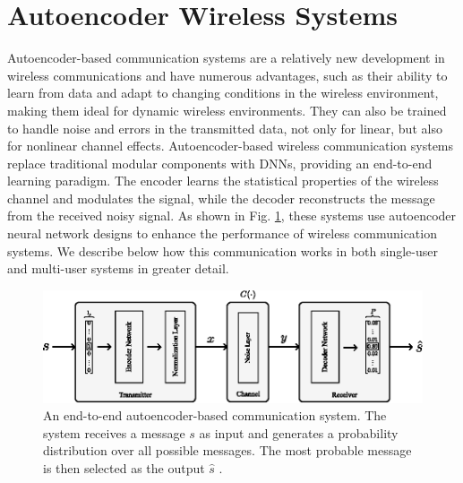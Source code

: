 \section{Autoencoder Wireless Systems}
\label{s:back}

Autoencoder-based communication systems are a relatively new development in wireless communications and have numerous advantages, such as their ability to learn from data and adapt to changing conditions in the wireless environment, making them ideal for dynamic wireless environments. They can also be trained to handle noise and errors in the transmitted data, not only for linear, but also for nonlinear channel effects. Autoencoder-based wireless communication systems replace traditional modular components with DNNs, providing an end-to-end learning paradigm. The encoder learns the statistical properties of the wireless channel and modulates the signal, while the decoder reconstructs the message from the received noisy signal. As shown in Fig. \ref{fig:original_autoencoder_architecture}, these systems use autoencoder neural network designs \cite{baldi2012autoencoders} to enhance the performance of wireless communication systems. We describe below how this communication works in both single-user and multi-user systems in greater detail.

\begin{figure}[tp!]
	\center
	\includegraphics[width=.6\linewidth]{figs/original_autoencoder_architecture.eps}
	\caption{An end-to-end autoencoder-based communication system. The system receives a message \(s\) as input and generates a probability distribution over all possible messages. The most probable message is then selected as the output \(\hat{s}\) \cite{o2017introduction}.}	
	\label{fig:original_autoencoder_architecture}
\end{figure}

